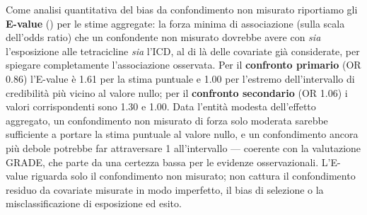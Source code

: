 \documentclass[
  letterpaper,
  DIV=11,
  numbers=noendperiod]{scrartcl}
\begin{document}
Come analisi quantitativa del bias da confondimento non misurato
riportiamo gli \textbf{E-value}
() per le
stime aggregate: la forza minima di associazione (sulla scala dell'odds
ratio) che un confondente non misurato dovrebbe avere con \emph{sia}
l'esposizione alle tetracicline \emph{sia} l'ICD, al di là delle
covariate già considerate, per spiegare completamente l'associazione
osservata. Per il \textbf{confronto primario} (OR 0.86) l'E-value è 1.61
per la stima puntuale e 1.00 per l'estremo dell'intervallo di
credibilità più vicino al valore nullo; per il \textbf{confronto
secondario} (OR 1.06) i valori corrispondenti sono 1.30 e 1.00. Data
l'entità modesta dell'effetto aggregato, un confondimento non misurato
di forza solo moderata sarebbe sufficiente a portare la stima puntuale
al valore nullo, e un confondimento ancora più debole potrebbe far
attraversare 1 all'intervallo --- coerente con la valutazione GRADE, che
parte da una certezza bassa per le evidenze osservazionali. L'E-value
riguarda solo il confondimento non misurato; non cattura il
confondimento residuo da covariate misurate in modo imperfetto, il bias
di selezione o la misclassificazione di esposizione ed esito.
\end{document}
